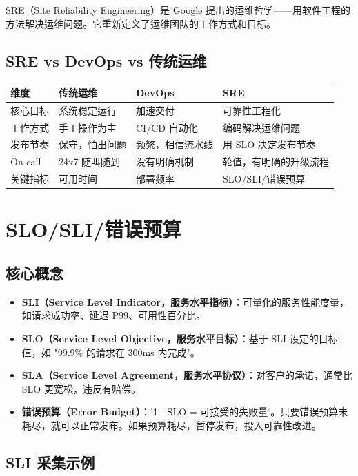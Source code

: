 \documentclass[12pt,UTF8]{ctexbook}
\begin{document}
SRE（Site Reliability Engineering）是 Google 提出的运维哲学——用软件工程的方法解决运维问题。它重新定义了运维团队的工作方式和目标。

\subsection*{SRE vs DevOps vs 传统运维}

\begin{tabular}{|p{2.5cm}|p{3.2cm}|p{3.2cm}|p{3.2cm}|}
\hline
\textbf{维度} & \textbf{传统运维} & \textbf{DevOps} & \textbf{SRE} \\
\hline
核心目标 & 系统稳定运行 & 加速交付 & 可靠性工程化 \\
\hline
工作方式 & 手工操作为主 & CI/CD 自动化 & 编码解决运维问题 \\
\hline
发布节奏 & 保守，怕出问题 & 频繁，相信流水线 & 用 SLO 决定发布节奏 \\
\hline
On-call & 24x7 随叫随到 & 没有明确机制 & 轮值，有明确的升级流程 \\
\hline
关键指标 & 可用时间 & 部署频率 & SLO/SLI/错误预算 \\
\hline
\end{tabular}

\section{SLO/SLI/错误预算}
\label{sec:slo}

\subsection*{核心概念}

\begin{itemize}
    \item \textbf{SLI（Service Level Indicator，服务水平指标）}：可量化的服务性能度量，如请求成功率、延迟 P99、可用性百分比。
    \item \textbf{SLO（Service Level Objective，服务水平目标）}：基于 SLI 设定的目标值，如 "99.9\% 的请求在 300ms 内完成"。
    \item \textbf{SLA（Service Level Agreement，服务水平协议）}：对客户的承诺，通常比 SLO 更宽松，违反有赔偿。
    \item \textbf{错误预算（Error Budget）}：`1 - SLO = 可接受的失败量`。只要错误预算未耗尽，就可以正常发布。如果预算耗尽，暂停发布，投入可靠性改进。
\end{itemize}

\subsection*{SLI 采集示例}
\end{document}

